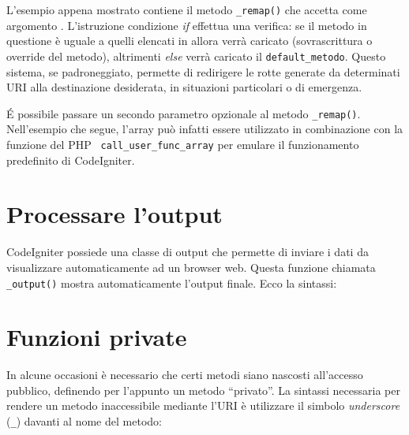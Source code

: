 
L'esempio appena mostrato contiene il metodo \verb|_remap()| che accetta come argomento . L'istruzione condizione \emph{if} effettua una verifica: se il metodo in questione è uguale a quelli elencati in  allora verrà caricato  (sovrascrittura o override del metodo), altrimenti \emph{else} verrà caricato il \verb|default_metodo|. Questo sistema, se padroneggiato, permette di redirigere le rotte generate da determinati \ac{URI} alla destinazione desiderata, in situazioni particolari o di emergenza.

\'E possibile passare un secondo parametro opzionale al metodo \verb|_remap()|. Nell'esempio che segue, l'array può infatti essere utilizzato in combinazione con la funzione del \ac{PHP} \verb| call_user_func_array| per emulare il funzionamento predefinito di CodeIgniter.


\section*{Processare l'output}
CodeIgniter possiede una classe di output che permette di inviare i dati da visualizzare automaticamente ad un browser web. Questa funzione chiamata \verb|_output()| mostra automaticamente l'output finale. Ecco la sintassi:


\section*{Funzioni private}
In alcune occasioni è necessario che certi metodi siano nascosti all'accesso pubblico, definendo per l'appunto un metodo ``privato''. La sintassi necessaria per rendere un metodo inaccessibile mediante l'\ac{URI} è utilizzare il simbolo \emph{underscore} (\verb|_|) davanti al nome del metodo:


